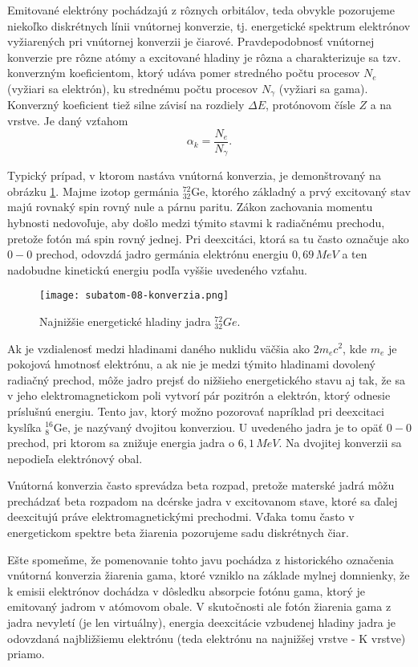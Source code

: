 \documentclass[../../main.tex]{subfiles}
\begin{document}
Emitované elektróny pochádzajú z rôznych orbitálov, teda obvykle pozorujeme niekoľko diskrétnych línii vnútornej konverzie, tj. energetické spektrum elektrónov vyžiarených pri vnútornej konverzii je čiarové. Pravdepodobnosť vnútornej konverzie pre rôzne atómy a excitované hladiny je rôzna a charakterizuje sa tzv. konverzným koeficientom, ktorý udáva pomer stredného počtu procesov $N_e$ (vyžiari sa elektrón), ku strednému počtu procesov $N_{\gamma}$ (vyžiari sa gama). Konverzný koeficient tiež silne závisí na rozdiely $\Delta E$, protónovom čísle $Z$ a na vrstve. Je daný vzťahom
$$ \alpha_k = \frac{N_e}{N_{\gamma}}. $$

Typický prípad, v ktorom nastáva vnútorná konverzia, je demonštrovaný na obrázku \ref{sf8:fig:konverzia}. Majme izotop germánia $_{32}^{72}$Ge, ktorého základný a prvý excitovaný stav majú rovnaký spin rovný nule a párnu paritu. Zákon zachovania momentu hybnosti nedovoľuje, aby došlo medzi týmito stavmi k radiačnému prechodu, pretože fotón má spin rovný jednej. Pri deexcitáci, ktorá sa tu často označuje ako $0-0$ prechod, odovzdá jadro germánia elektrónu energiu $0,69\,\unit{MeV}$ a ten nadobudne kinetickú energiu podľa vyššie uvedeného vzťahu.

\begin{figure}[!h]
\texttt{[image: subatom-08-konverzia.png]}
\centering
\caption{Najnižšie energetické hladiny jadra $_{32}^{72}Ge$.}
\label{sf8:fig:konverzia}
\end{figure}

Ak je vzdialenosť medzi hladinami daného nuklidu väčšia ako $2m_ec^2$, kde $m_e$ je pokojová hmotnosť elektrónu, a ak nie je medzi týmito hladinami dovolený radiačný prechod, môže jadro prejsť do nižšieho energetického stavu aj tak, že sa v jeho elektromagnetickom poli vytvorí pár pozitrón a elektrón, ktorý odnesie príslušnú energiu. Tento jav, ktorý možno pozorovať napríklad pri deexcitaci kyslíka $_{8}^{16}$Ge, je nazývaný dvojitou konverziou. U uvedeného jadra je to opäť $0-0$ prechod, pri ktorom sa znižuje energia jadra o $6,1\,\unit{MeV}$. Na dvojitej konverzii sa nepodieľa elektrónový obal. 

Vnútorná konverzia často sprevádza beta rozpad, pretože materské jadrá môžu prechádzať beta rozpadom na dcérske jadra v excitovanom stave, ktoré sa ďalej deexcitujú práve elektromagnetickými prechodmi. Vďaka tomu často v energetickom spektre beta žiarenia pozorujeme sadu diskrétnych čiar. 

Ešte spomeňme, že pomenovanie tohto javu pochádza z historického označenia vnútorná konverzia žiarenia gama, ktoré vzniklo na základe mylnej domnienky, že k emisii elektrónov dochádza v dôsledku absorpcie fotónu gama, ktorý je emitovaný jadrom v atómovom obale. V skutočnosti ale fotón žiarenia gama z jadra nevyletí (je len virtuálny), energia deexcitácie vzbudenej hladiny jadra je odovzdaná najbližšiemu elektrónu (teda elektrónu na najnižšej vrstve - K vrstve) priamo.
\end{document}
